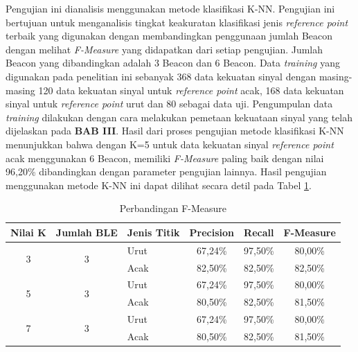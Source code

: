 \begin{enumerate}
\par Pengujian ini dianalisis menggunakan metode klasifikasi K-NN. Pengujian ini bertujuan untuk menganalisis tingkat keakuratan klasifikasi jenis \textit{reference point} terbaik yang digunakan dengan membandingkan penggunaan jumlah Beacon dengan melihat \textit{F-Measure} yang didapatkan dari setiap pengujian. Jumlah Beacon yang dibandingkan adalah 3 Beacon dan 6 Beacon. Data \textit{training} yang digunakan pada penelitian ini sebanyak 368 data kekuatan sinyal dengan masing-masing 120 data kekuatan sinyal untuk \textit{reference point} acak, 168 data kekuatan sinyal untuk \textit{reference point} urut dan 80 sebagai data uji. Pengumpulan data \textit{training} dilakukan dengan cara melakukan pemetaan kekuataan sinyal yang telah dijelaskan pada \textbf{BAB III}. Hasil dari proses pengujian metode klasifikasi K-NN menunjukkan bahwa dengan K=5 untuk data kekuatan sinyal \textit{reference point} acak menggunakan 6 Beacon, memiliki \textit{F-Measure} paling baik dengan nilai 96,20\% dibandingkan dengan parameter pengujian lainnya. Hasil pengujian menggunakan metode K-NN ini dapat dilihat secara detil pada Tabel \ref{tabelfmeasureee}.
\begin{table}[H]
\fontsize{10}{12}\selectfont
\center
\caption{Perbandingan F-Measure}
\label{tabelfmeasureee}
\begin{tabular}{|c|c|l|c|c|c|}
\hline
Nilai K            & Jumlah BLE         & \multicolumn{1}{c|}{Jenis Titik} & Precision & Recall  & F-Measure \\ \hline
\multirow{2}{*}{3} & \multirow{2}{*}{3} & Urut                             & 67,24\%   & 97,50\% & 80,00\%    \\ \cline{3-6} 
                   &                    & Acak                             & 82,50\%   & 82,50\% & 82,50\%   \\ \hline
\multirow{2}{*}{5} & \multirow{2}{*}{3} & Urut                             & 67,24\%   & 97,50\% & 80,00\%    \\ \cline{3-6} 
                   &                    & Acak                             & 80,50\%   & 82,50\% & 81,50\%   \\ \hline
\multirow{2}{*}{7} & \multirow{2}{*}{3} & Urut                             & 67,24\%   & 97,50\% & 80,00\%    \\ \cline{3-6} 
                   &                    & Acak                             & 80,50\%   & 82,50\% & 81,50\%   \\ \hline

\end{tabular}
\end{table}
\end{enumerate}
